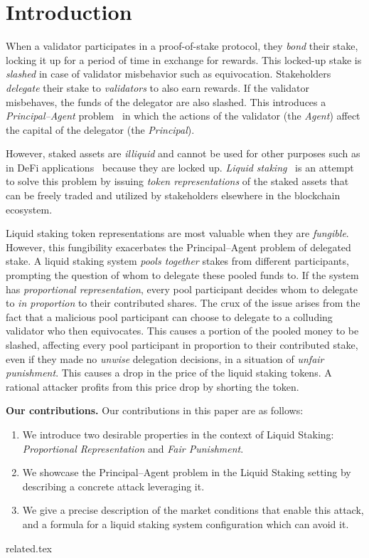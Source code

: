 \section{Introduction}

When a validator participates in a proof-of-stake
protocol, they \emph{bond} their stake, locking it up for a period of time
in exchange for rewards.
This locked-up stake is \emph{slashed} in case of validator misbehavior
such as equivocation.
Stakeholders \emph{delegate} their stake to \emph{validators} to also
earn rewards. If the validator misbehaves,
the funds of the delegator are also slashed. This introduces a
\emph{Principal--Agent} problem~\cite{jensen1976,wealthofnations}
in which the actions of the validator (the \emph{Agent})
affect the capital of the delegator (the \emph{Principal}).

However, staked assets are \emph{illiquid} and cannot be used for
other purposes such as in DeFi applications~\cite{defi-sok}
because they are locked up.
\emph{Liquid staking}~\cite{liquid-staking-report}
is an attempt to solve this problem by issuing
\emph{token representations} of the staked assets that can be freely traded
and utilized by stakeholders elsewhere in the blockchain ecosystem.

Liquid staking token representations are most valuable when they are
\emph{fungible}. However, this fungibility exacerbates the Principal--Agent
problem of delegated stake.
A liquid staking system \emph{pools together} stakes from different participants,
prompting the question of whom to delegate these pooled funds to.
If the system has \emph{proportional representation}, every pool participant
decides whom to delegate to \emph{in proportion} to their contributed shares.
The crux of the issue arises from the fact
that a malicious pool participant can choose to delegate to
a colluding validator who then equivocates. This causes a portion
of the pooled money to be slashed,
affecting every pool participant
in proportion to their contributed stake, even if they made
no \emph{unwise} delegation decisions, in a situation of
\emph{unfair punishment}. This causes a drop in the price of the
liquid staking tokens. A rational attacker profits from this price
drop by shorting the token.

\noindent
\textbf{Our contributions.} Our contributions in this paper are as follows:
\begin{enumerate}
    \item We introduce two desirable properties in the context of Liquid Staking:
          \emph{Proportional Representation} and \emph{Fair Punishment}.
    \item We showcase the Principal--Agent problem in the Liquid Staking
          setting by describing a concrete attack leveraging it.
    \item We give a precise description of the market conditions that enable
          this attack, and a formula for a liquid staking system configuration
          which can avoid it.
\end{enumerate}

{related.tex}
